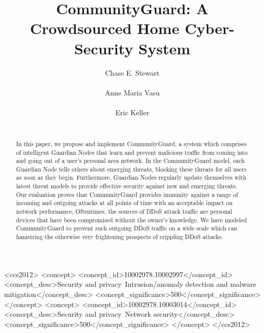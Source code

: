 \documentclass{sig-alternate-05-2015}
\begin{document}
\title{CommunityGuard: A Crowdsourced Home Cyber-Security System}

\author{
\alignauthor Chase E. Stewart \\
 \\
\alignauthor Anne Maria Vasu \\
 \\
\alignauthor Eric Keller \\
 \\
}



\setlength{\pdfpagewidth}{8.5in}
\setlength{\pdfpageheight}{11in}


\maketitle
\begin{abstract}
In this paper, we propose and implement CommunityGuard, a system which comprises of intelligent Guardian Nodes that learn and prevent malicious traffic from coming into and going out of a user's personal area network. In the CommunityGuard model, each Guardian Node tells others about emerging threats, blocking these threats for all users as soon as they begin. Furthermore, Guardian Nodes regularly update themselves with latest threat models to provide effective security against new and emerging threats. Our evaluation proves that CommunityGuard provides immunity against a range of incoming and outgoing attacks at all points of time with an acceptable impact on network performance. Oftentimes, the sources of DDoS attack traffic are personal devices that have been compromised without the owner's knowledge. We have modeled CommunityGuard to prevent such outgoing DDoS traffic on a wide scale which can hamstring the otherwise very frightening prospects of crippling DDoS attacks.
\end{abstract}

\begin{CCSXML}
<ccs2012>
	<concept>
		<concept_id>10002978.10002997</concept_id>
		<concept_desc>Security and privacy~Intrusion/anomaly detection and malware mitigation</concept_desc>
		<concept_significance>500</concept_significance>
	</concept>
	<concept>
		<concept_id>10002978.10003014</concept_id>
		<concept_desc>Security and privacy~Network security</concept_desc>
		<concept_significance>500</concept_significance>
	</concept>
</ccs2012>
\end{CCSXML}










\vfill\eject

%


\end{document}
